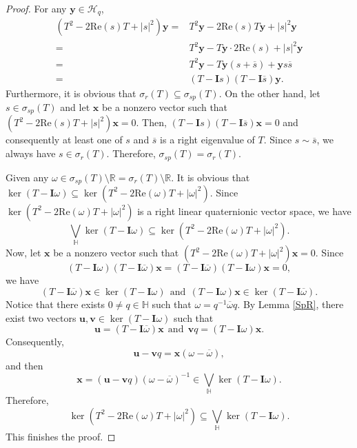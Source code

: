 \documentclass[pdflatex,sn-mathphys-num]{sn-jnl}%
\theoremstyle{thmstyleone}%
\theoremstyle{thmstyletwo}%
\theoremstyle{thmstylethree}%
\theoremstyle{definition}
\theoremstyle{remark}
\begin{document}
	\begin{proof}
	For any $\boldsymbol{y}\in\mathcal{H}_q$,
	\[
	\begin{aligned}
		(T^2-2\mathrm{Re}(s)T+|s|^2)\boldsymbol{y}=&T^2\boldsymbol{y}-2\mathrm{Re}(s)T\boldsymbol{y}+|s|^2\boldsymbol{y}\\
		=&T^2\boldsymbol{y}-T\boldsymbol{y}\cdot2\mathrm{Re}(s)+|s|^2\boldsymbol{y}\\
		=&T^2\boldsymbol{y}-T\boldsymbol{y}(s+\overline{s})+\boldsymbol{y}s\overline{s} \\
		=&(T-\mathbf{I}s)(T-\mathbf{I}\overline{s})\boldsymbol{y}.
	\end{aligned}
	\]
Furthermore, it is obvious that $\sigma_r(T)\subseteq\sigma_{sp}(T)$.
On the other hand, let $s\in\sigma_{sp}(T)$ and let $\boldsymbol{x}$ be a nonzero vector such that $(T^2-2\mathrm{Re}(s)T+|s|^2)\boldsymbol{x}=0$. Then,
$(T-\mathbf{I}s)(T-\mathbf{I}\overline{s})\boldsymbol{x}=0$
and consequently at least one of $s$ and $\overline{s}$ is a right eigenvalue of $T$. Since $s\sim\overline{s}$, we always have $s\in\sigma_{r}(T)$. Therefore, $\sigma_{sp}(T)=\sigma_r(T)$.

Given any $\omega\in\sigma_{sp}(T)\setminus\mathbb{R}=\sigma_r(T)\setminus\mathbb{R}$. It is obvious that $\ker(T-\boldsymbol{I}\omega)\subseteq\ker(T^2-2\mathrm{Re}(\omega)T+|\omega|^2)$. Since $\ker(T^2-2\mathrm{Re}(\omega)T+|\omega|^2)$  is a right linear quaternionic vector space, we have
\[
\bigvee_{\mathbb{H}} \ker(T-\boldsymbol{I}\omega)\subseteq\ker(T^2-2\mathrm{Re}(\omega)T+|\omega|^2).
\]
Now, let $\boldsymbol{x}$ be a nonzero vector
such that $(T^2-2\mathrm{Re}(\omega)T+|\omega|^2)\boldsymbol{x}=0$. Since
\[
(T-\mathbf{I}\omega)(T-\mathbf{I}\overline{\omega})\boldsymbol{x}=(T-\mathbf{I}\overline{\omega})(T-\mathbf{I}\omega)\boldsymbol{x}=0,
\]
we have
\[
(T-\mathbf{I}\overline{\omega})\boldsymbol{x}\in\ker(T-\mathbf{I}\omega) \ \ \text{and} \ \ (T-\mathbf{I}\omega)\boldsymbol{x}\in\ker(T-\mathbf{I}\overline{\omega}).
\]
Notice that there exists $0\neq q\in\mathbb{H}$ such that $\omega=q^{-1}\overline{\omega}q$.
By Lemma \ref{SpR}, there exist two vectors $\boldsymbol{u}, \boldsymbol{v}\in \ker(T-\mathbf{I}\omega)$ such that
\[
\boldsymbol{u}=(T-\mathbf{I}\overline{\omega})\boldsymbol{x} \ \ \text{and} \ \ \boldsymbol{v}q=(T-\mathbf{I}\omega)\boldsymbol{x}.
\]
Consequently,
\[
\boldsymbol{u}-\boldsymbol{v}q=\boldsymbol{x}(\omega-\overline{\omega}),
\]
and then
\[
\boldsymbol{x}=(\boldsymbol{u}-\boldsymbol{v}q)(\omega-\overline{\omega})^{-1}\in\bigvee_{\mathbb{H}} \ker(T-\boldsymbol{I}\omega).
\]
Therefore,
\[
\ker(T^2-2\mathrm{Re}(\omega)T+|\omega|^2)\subseteq\bigvee_{\mathbb{H}} \ker(T-\boldsymbol{I}\omega).
\]
This finishes the proof.
	\end{proof}
\end{document}
